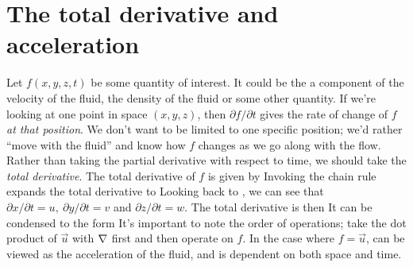 \documentclass[12pt]{book}
\begin{document}
\section{The total derivative and acceleration}
Let $f(x,y,z,t)$ be some quantity of interest.  It could be the a component of the velocity of the fluid, the density of the fluid or some other quantity.  If we're looking at one point in space $(x,y,z)$, then $\partial f / \partial t$ gives the rate of change of $f$ \textit{at that position}.  We don't want to be limited to one specific position; we'd rather ``move with the fluid'' and know how $f$ changes as we go along with the flow.  Rather than taking the partial derivative with respect to time, we should take the \textit{total derivative}.  The total derivative of $f$ is given by
Invoking the chain rule expands the total derivative to
Looking back to , we can see that $\partial x / \partial t = u,\  \partial y / \partial t = v$ and $\partial z / \partial t = w$.  The total derivative is then
It can be condensed to the form
It's important to note the order of operations; take the dot product of $\vec u$ with $\Nabla$ first and then operate on $f$.
In the case where $f=\vec u$,  can be viewed as the acceleration of the fluid, and is dependent on both space and time.

\end{document}
